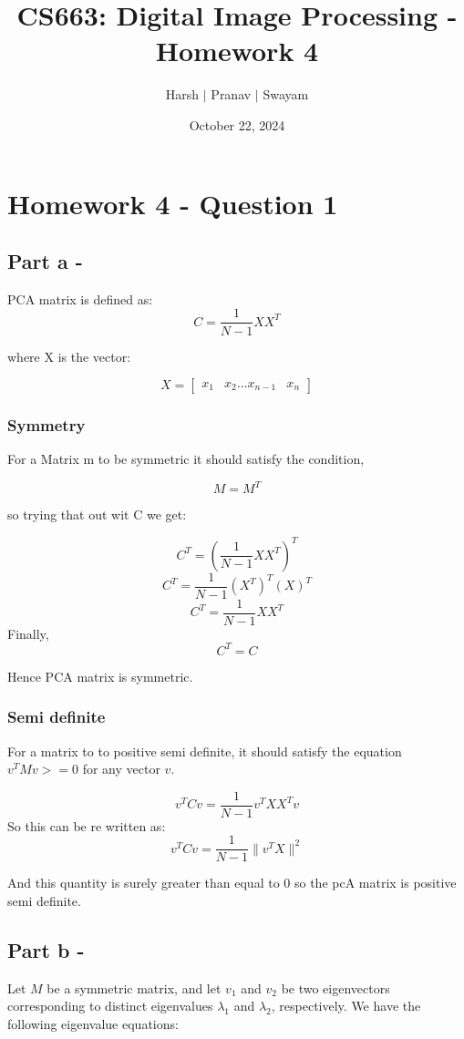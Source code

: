\documentclass{article}
\title{CS663: Digital Image Processing - Homework 4}
\author{Harsh $\vert$ Pranav $\vert$ Swayam}
\date{October 22, 2024}
\begin{document}
\maketitle
\flushleft
\section*{Homework 4 - Question 1}

\subsection*{Part a -}

PCA matrix is defined as:
\[
C = \frac{1}{N-1} X  X^T
\]


where X is the vector:

\[
X=\begin{bmatrix} x_1 & x_2 \dots x_{n-1} & x_n\end{bmatrix}
\]

\subsubsection*{Symmetry}

For a Matrix m to be symmetric it should satisfy the condition,

\[
M = M^T
\]

so trying that out wit C we get:

\[
C^T = (\frac{1}{N-1} XX^T)^T
\]
\[
C^T = \frac{1}{N-1} (X^T)^T(X)^T
\]
\[
C^T = \frac{1}{N-1} XX^T
\]
Finally,
\[
C^T = C
\]

Hence PCA matrix is symmetric.

\subsubsection*{Semi definite}

For a matrix to to positive semi definite, it should satisfy the equation $v^TMv>=0$ for any vector $v$.

\[
v^TCv = \frac{1}{N-1} v^TXX^Tv
\]
So this can be re written as:
\[
v^TCv = \frac{1}{N-1} \|{v^T X}\|^2
\]

And this quantity is surely greater than equal to 0 so the pcA matrix is positive semi definite.

\subsection*{Part b - }

Let $M$ be a symmetric matrix, and let $v_1$ and $v_2$ be two eigenvectors corresponding to distinct eigenvalues $\lambda_1$ and $\lambda_2$, respectively. We have the following eigenvalue equations:
\end{document}
